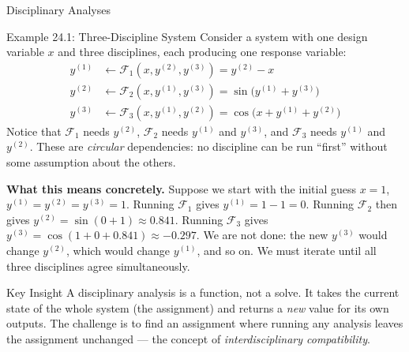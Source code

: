 \documentclass[aspectratio=169,10pt]{beamer}
\begin{document}
\begin{frame}[allowframebreaks]{Disciplinary Analyses}
  \begin{exampleblock}{Example 24.1: Three-Discipline System}
    Consider a system with one design variable $x$ and three disciplines,
    each producing one response variable:
    \begin{align*}
      y^{(1)} &\leftarrow \mathcal{F}_1\!\left(x, y^{(2)}, y^{(3)}\right)
               = y^{(2)} - x \\
      y^{(2)} &\leftarrow \mathcal{F}_2\!\left(x, y^{(1)}, y^{(3)}\right)
               = \sin\!\bigl(y^{(1)} + y^{(3)}\bigr) \\
      y^{(3)} &\leftarrow \mathcal{F}_3\!\left(x, y^{(1)}, y^{(2)}\right)
               = \cos\!\bigl(x + y^{(1)} + y^{(2)}\bigr)
    \end{align*}
    Notice that $\mathcal{F}_1$ needs $y^{(2)}$, $\mathcal{F}_2$ needs
    $y^{(1)}$ and $y^{(3)}$, and $\mathcal{F}_3$ needs $y^{(1)}$ and
    $y^{(2)}$.  These are \emph{circular} dependencies: no discipline can
    be run ``first'' without some assumption about the others.
  \end{exampleblock}

  \medskip
  \textbf{What this means concretely.}  Suppose we start with the initial
  guess $x=1$, $y^{(1)}=y^{(2)}=y^{(3)}=1$.  Running $\mathcal{F}_1$
  gives $y^{(1)} = 1 - 1 = 0$.  Running $\mathcal{F}_2$ then gives
  $y^{(2)} = \sin(0 + 1) \approx 0.841$.  Running $\mathcal{F}_3$ gives
  $y^{(3)} = \cos(1 + 0 + 0.841) \approx -0.297$.  We are not done: the
  new $y^{(3)}$ would change $y^{(2)}$, which would change $y^{(1)}$, and
  so on.  We must iterate until all three disciplines agree simultaneously.

  \begin{alertblock}{Key Insight}
    A disciplinary analysis is a function, not a solve.  It takes the
    current state of the whole system (the assignment) and returns a
    \emph{new} value for its own outputs.  The challenge is to find an
    assignment where running any analysis leaves the assignment unchanged
    --- the concept of \emph{interdisciplinary compatibility}.
  \end{alertblock}

\end{frame}
\end{document}
